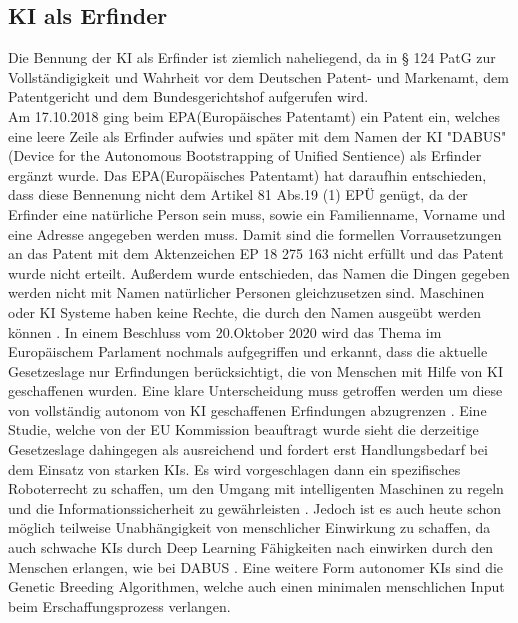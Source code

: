 \subsection{KI als Erfinder}
Die Bennung der KI als Erfinder ist ziemlich naheliegend, 
da in § 124 PatG zur Vollständigigkeit und Wahrheit vor dem
Deutschen Patent- und Markenamt, 
dem Patentgericht und dem Bundesgerichtshof aufgerufen wird.
\\
Am 17.10.2018 ging beim EPA(Europäisches Patentamt) ein Patent ein, 
welches eine leere Zeile als Erfinder aufwies und später mit 
dem Namen der KI 
"DABUS"(Device for the Autonomous Bootstrapping of Unified Sentience) 
als Erfinder ergänzt wurde. 
Das EPA(Europäisches Patentamt) hat daraufhin entschieden, 
dass diese Bennenung nicht dem Artikel 81 Abs.19 (1) EPÜ genügt,
da der Erfinder eine natürliche Person sein muss, sowie ein 
Familienname, Vorname und eine Adresse angegeben werden muss.
Damit sind die formellen Vorrausetzungen an das Patent mit dem Aktenzeichen
EP 18 275 163 nicht erfüllt und das Patent wurde nicht erteilt. 
Außerdem wurde entschieden, das Namen die Dingen gegeben werden nicht
mit Namen natürlicher Personen gleichzusetzen sind. Maschinen oder KI
Systeme haben keine Rechte, die durch den Namen ausgeübt werden können 
\cite{EPA27012020}. 
In einem Beschluss vom 20.Oktober 2020 wird das Thema im Europäischem
Parlament nochmals aufgegriffen und erkannt, 
dass die aktuelle Gesetzeslage nur Erfindungen berücksichtigt,
die von Menschen mit Hilfe von KI geschaffenen wurden. 
Eine klare Unterscheidung muss getroffen werden um diese 
von vollständig autonom von KI geschaffenen Erfindungen abzugrenzen
\cite{TextsAdoptedIntellectual}.
Eine Studie, welche von der EU Kommission beauftragt wurde 
sieht die derzeitige Gesetzeslage dahingegen als ausreichend 
und fordert erst Handlungsbedarf bei dem Einsatz von starken KIs.
Es wird vorgeschlagen dann ein spezifisches Roboterrecht zu schaffen, 
um den Umgang mit intelligenten Maschinen zu regeln 
und die Informationssicherheit zu gewährleisten
\cite{gutaAPPLICABILITYGDPRARTIFICIAL2022}.
Jedoch ist es auch heute schon möglich teilweise 
Unabhängigkeit von menschlicher Einwirkung
zu schaffen, da auch schwache KIs durch Deep Learning 
Fähigkeiten nach einwirken durch den Menschen erlangen, wie bei DABUS
\cite{surdenMachineLearningLaw}\cite{dornisDornisSchopfungOhne2021}.
Eine weitere Form autonomer KIs sind die Genetic Breeding Algorithmen,
welche auch einen minimalen menschlichen Input beim Erschaffungsprozess 
verlangen.
\\
